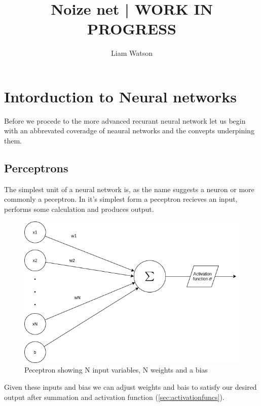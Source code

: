 \documentclass{article}
\title{Noize net | WORK IN PROGRESS}
\author{Liam Watson}
\begin{document}
\maketitle

\section{Intorduction to Neural networks}
\label{sec:intro}
Before we procede to the more advanced recurant neural network let us begin with an abbrevated coveradge of neaural networks and the convepts underpining them. 
\subsection{Perceptrons}
\label{sec:peceptrons}
The simplest unit of a neural network is, as the name suggests a neuron or more commonly a peceptron. In it's simplest form a peceptron recieves an input, performs some calculation and produces output.
\begin{figure}[h]
\caption{Peceptron showing N input variables, N weights and a bias}
\includegraphics[scale=0.5]{peceptron.png}
\end{figure}
Given these inputs and bias we can adjust weights and bais to satisfy our desired output after summation and activation function (\ref{sec:activationfuncs}). 
\end{document}
